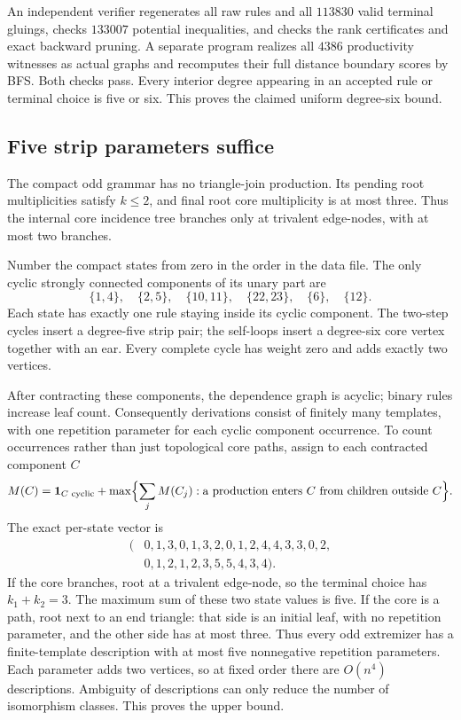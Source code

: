 An independent verifier regenerates all raw rules and all $113830$
valid terminal gluings, checks $133007$ potential inequalities, and
checks the rank certificates and exact backward pruning.  A separate
program realizes all $4386$ productivity witnesses as actual graphs
and recomputes their full distance boundary scores by BFS.  Both
checks pass.  Every interior degree appearing in an accepted rule
or terminal choice is five or six.  This proves the claimed uniform
degree-six bound.

\subsection{Five strip parameters suffice}

The compact odd grammar has no triangle-join production.  Its pending
root multiplicities satisfy $k\le2$, and final root core multiplicity
is at most three.  Thus the internal core incidence tree branches
only at trivalent edge-nodes, with at most two branches.

Number the compact states from zero in the order in the data file.
The only cyclic strongly connected components of its unary part are
\[
 \{1,4\},\quad\{2,5\},\quad\{10,11\},\quad\{22,23\},
 \quad\{6\},\quad\{12\}.
\]
Each state has exactly one rule staying inside its cyclic component.
The two-step cycles insert a degree-five strip pair; the self-loops
insert a degree-six core vertex together with an ear.  Every complete
cycle has weight zero and adds exactly two vertices.

After contracting these components, the dependence graph is acyclic;
binary rules increase leaf count.  Consequently derivations consist
of finitely many templates, with one repetition parameter for each
cyclic component occurrence.  To count occurrences rather than just
topological core paths, assign to each contracted component $C$
\[
 M(C)=\mathbf1_{C\text{ cyclic}}+
 \max\Bigl\{\sum_j M(C_j):
    \text{a production enters }C\text{ from children outside }C\Bigr\}.
\]
The exact per-state vector is
\[
\begin{split}
(&0,1,3,0,1,3,2,0,1,2,4,4,3,3,0,2,\\
 &0,1,2,1,2,3,5,5,4,3,4).
\end{split}
\]
If the core branches, root at a trivalent edge-node, so the terminal
choice has $k_1+k_2=3$.  The maximum sum of these two state values is
five.  If the core is a path, root next to an end triangle: that side
is an initial leaf, with no repetition parameter, and the other side
has at most three.  Thus every odd extremizer has a finite-template
description with at most five nonnegative repetition parameters.
Each parameter adds two vertices, so at fixed order there are
$O(n^4)$ descriptions.  Ambiguity of descriptions can only reduce
the number of isomorphism classes.  This proves the upper bound.


